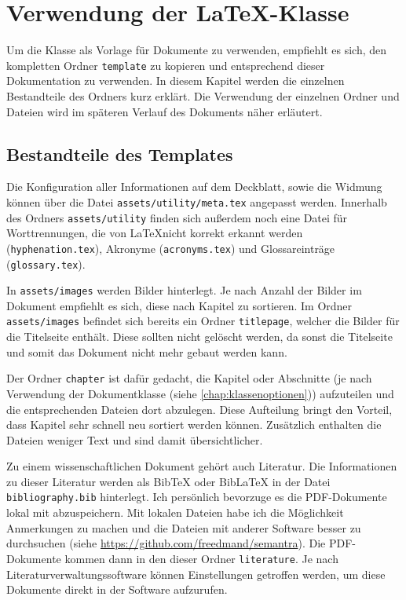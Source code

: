\chapter{Verwendung der \LaTeX-Klasse}
Um die Klasse als Vorlage für Dokumente zu verwenden, empfiehlt es sich, den kompletten Ordner \texttt{template} zu kopieren und entsprechend dieser Dokumentation zu verwenden. In diesem Kapitel werden die einzelnen Bestandteile des Ordners kurz erklärt. Die Verwendung der einzelnen Ordner und Dateien wird im späteren Verlauf des Dokuments näher erläutert.

\section{Bestandteile des Templates}
Die Konfiguration aller Informationen auf dem Deckblatt, sowie die Widmung können über die Datei \texttt{assets/utility/meta.tex} angepasst werden. Innerhalb des Ordners \texttt{assets/utility} finden sich außerdem noch eine Datei für Worttrennungen, die von \LaTeX nicht korrekt erkannt werden (\texttt{hyphenation.tex}), Akronyme (\texttt{acronyms.tex}) und Glossareinträge (\texttt{glossary.tex}).

In \texttt{assets/images} werden Bilder hinterlegt. Je nach Anzahl der Bilder im Dokument empfiehlt es sich, diese nach Kapitel zu sortieren. Im Ordner \texttt{assets/images} befindet sich bereits ein Ordner \texttt{titlepage}, welcher die Bilder für die Titelseite enthält. Diese sollten nicht gelöscht werden, da sonst die Titelseite und somit das Dokument nicht mehr gebaut werden kann.

Der Ordner \texttt{chapter} ist dafür gedacht, die Kapitel oder Abschnitte (je nach Verwendung der Dokumentklasse (siehe \autoref{chap:klassenoptionen})) aufzuteilen und die entsprechenden Dateien dort abzulegen. Diese Aufteilung bringt den Vorteil, dass Kapitel sehr schnell neu sortiert werden können. Zusätzlich enthalten die Dateien weniger Text und sind damit übersichtlicher.

Zu einem wissenschaftlichen Dokument gehört auch Literatur. Die Informationen zu dieser Literatur werden als BibTeX oder BibLaTeX in der Datei \texttt{bibliography.bib} hinterlegt. Ich persönlich bevorzuge es die PDF-Dokumente lokal mit abzuspeichern. Mit lokalen Dateien habe ich die Möglichkeit Anmerkungen zu machen und die Dateien mit anderer Software besser zu durchsuchen (siehe \url{https://github.com/freedmand/semantra}). Die PDF-Dokumente kommen dann in den dieser Ordner \texttt{literature}. Je nach Literaturverwaltungssoftware können Einstellungen getroffen werden, um diese Dokumente direkt in der Software aufzurufen.

